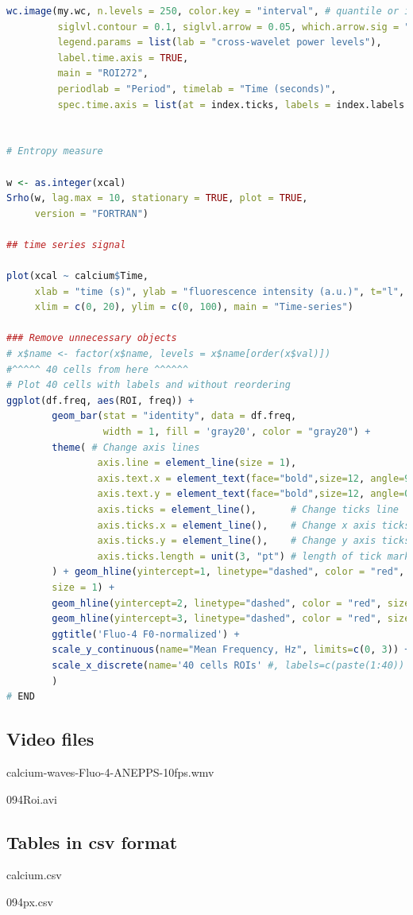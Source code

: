 \documentclass{biophys-new}
\begin{document}
\begin{lstlisting}[language=R]
wc.image(my.wc, n.levels = 250, color.key = "interval", # quantile or interval
         siglvl.contour = 0.1, siglvl.arrow = 0.05, which.arrow.sig = "wt",
         legend.params = list(lab = "cross-wavelet power levels"),
         label.time.axis = TRUE,
         main = "ROI272",
         periodlab = "Period", timelab = "Time (seconds)",
         spec.time.axis = list(at = index.ticks, labels = index.labels.rounded))


# Entropy measure

w <- as.integer(xcal)
Srho(w, lag.max = 10, stationary = TRUE, plot = TRUE,
     version = "FORTRAN")

## time series signal

plot(xcal ~ calcium$Time,
     xlab = "time (s)", ylab = "fluorescence intensity (a.u.)", t="l",
     xlim = c(0, 20), ylim = c(0, 100), main = "Time-series")

### Remove unnecessary objects
# x$name <- factor(x$name, levels = x$name[order(x$val)])
#^^^^^ 40 cells from here ^^^^^^
# Plot 40 cells with labels and without reordering
ggplot(df.freq, aes(ROI, freq)) +
        geom_bar(stat = "identity", data = df.freq,
                 width = 1, fill = 'gray20', color = "gray20") +
        theme( # Change axis lines
                axis.line = element_line(size = 1),
                axis.text.x = element_text(face="bold",size=12, angle=90),
                axis.text.y = element_text(face="bold",size=12, angle=0),
                axis.ticks = element_line(),      # Change ticks line
                axis.ticks.x = element_line(),    # Change x axis ticks only
                axis.ticks.y = element_line(),    # Change y axis ticks only
                axis.ticks.length = unit(3, "pt") # length of tick marks
        ) + geom_hline(yintercept=1, linetype="dashed", color = "red",
        size = 1) +
        geom_hline(yintercept=2, linetype="dashed", color = "red", size=1) +
        geom_hline(yintercept=3, linetype="dashed", color = "red", size=1) +
        ggtitle('Fluo-4 F0-normalized') +
        scale_y_continuous(name="Mean Frequency, Hz", limits=c(0, 3)) +
        scale_x_discrete(name='40 cells ROIs' #, labels=c(paste(1:40))
        )
# END
\end{lstlisting}

\subsection*{Video files}

calcium-waves-Fluo-4-ANEPPS-10fps.wmv

094Roi.avi

\subsection*{Tables in csv format}

calcium.csv

094px.csv

\end{document}
